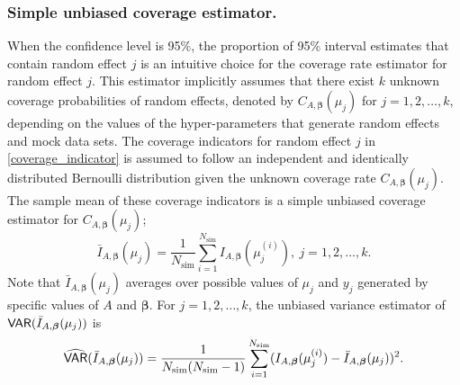 \documentclass[article]{jss}
\begin{document}




\subsubsection{Simple unbiased coverage estimator.}
When the confidence level is 95\%, the proportion of 95\% interval estimates that contain random effect $j$ is an intuitive choice for  the coverage rate estimator for random effect $j$. This estimator  implicitly assumes that there exist $k$ unknown coverage probabilities of random effects, denoted by $C_{A, \boldsymbol{\beta}}(\mu_j)$ for $j=1, 2, \ldots, k$, depending on the values of the hyper-parameters that generate random effects and mock data sets. The coverage indicators for random effect $j$ in  \eqref{coverage_indicator} is assumed to follow an independent and identically distributed  Bernoulli distribution given the unknown coverage rate $C_{A, \boldsymbol{\beta}}(\mu_j)$. The sample mean of these coverage indicators is a simple unbiased coverage estimator for $C_{A, \boldsymbol{\beta}}(\mu_j)$;  %
\begin{equation}
\bar{I}_{A, \boldsymbol{\beta}}(\mu_j)= \frac{1}{N_{\textrm{sim}}}\sum_{i=1}^{N_{\textrm{sim}}}I_{A, \boldsymbol{\beta}}(\mu_j^{(i)}),~ j=1, 2, \ldots, k.
\end{equation}
Note that $\bar{I}_{A, \boldsymbol{\beta}}(\mu_j)$ averages over possible values of $\mu_{j}$ and $y_{j}$ generated by specific values of $A$ and $\boldsymbol{\beta}$. For $j=1, 2, \ldots, k$, the unbiased variance estimator of $\mathsf{VAR}(\bar{I}_{A, \boldsymbol{\beta}}(\mu_j))$ is 
\begin{equation}\label{svar}
\widehat{\mathsf{VAR}}(\bar{I}_{A, \boldsymbol{\beta}}(\mu_j))=\frac{1}{N_{\textrm{sim}}(N_{\textrm{sim}}-1)}\sum_{i=1}^{N_{\textrm{sim}}}(I_{A, \boldsymbol{\beta}}(\mu_j^{(i)})-\bar{I}_{A, \boldsymbol{\beta}}(\mu_j))^{2}.
\end{equation}
\end{document}
